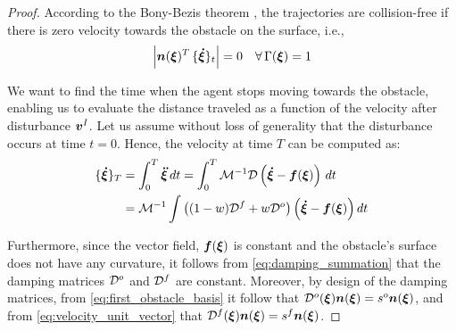\begin{proof}
According to the Bony-Bezis theorem \parencite{bony1969principe}, the trajectories are collision-free if there is zero velocity towards the obstacle on the surface, i.e.,
\begin{equation}
	\left| \vect n(\vecs \xi)^T \, \{ \vecs{\dot \xi} \}_{t} \right| = 0 
	\quad \forall \, \Gamma(\vecs \xi) = 1
	\label{eq:bezis_theorem}
\end{equation}

We want to find the time when the agent stops moving towards the obstacle, enabling us to evaluate the distance traveled as a function of the velocity after disturbance $\boldsymbol{v}^I$. 
Let us assume without loss of generality that the disturbance occurs at time $t=0$. Hence, the velocity at time $T$ can be computed as:
\begin{equation}
\begin{split}
	\{ \vecs{\dot \xi} \}_{T} 
	& = \int_0^T \vecs{\ddot \xi} \, dt = \int_0^T \matd{M}^{-1} \matd{D} \left( \vecs{\dot \xi} - \vect f(\vecs \xi ) \right) \, dt \\
	& = \matd{M}^{-1} \int \left( (1 - w) \matd{D}^f + w \matd{D}^{o} \right) \left( \vecs{\dot \xi} - \vect f (\vecs \xi ) \right) dt \\
	\end{split}
\label{eq:velocity_evolution}
\end{equation}

Furthermore, since the vector field, $\boldsymbol{f}(\boldsymbol{\xi})$ is constant and the obstacle's surface does not have any curvature, it follows from \eqref{eq:damping_summation} that the damping matrices  $\mathcal{D}^o$ and $\mathcal{D}^f$ are constant.
Moreover, by design of the damping matrices, from \eqref{eq:first_obstacle_basis} it follow that $\mathcal{D}^o(\boldsymbol{\xi}) \boldsymbol{n}(\boldsymbol{\xi}) = s^o \boldsymbol{n}(\boldsymbol{\xi})$, and from  \eqref{eq:velocity_unit_vector} that $\mathcal{D}^f(\boldsymbol{\xi}) \boldsymbol{n}(\boldsymbol{\xi}) = s^f \boldsymbol{n}(\boldsymbol{\xi})$. 


\end{proof}

